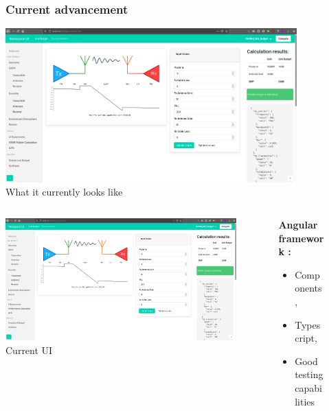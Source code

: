 \documentclass[11pt]{beamer}
\begin{document}
\begin{frame}
	\begin{figure}
		\frametitle{Current advancement}
		\includegraphics[width=\textwidth]{nlb.png}
			\caption{What it currently looks like}
	\end{figure}
\end{frame}

\begin{frame}
\begin{columns}[onlytextwidth]
	\begin{column}{0.4\textwidth}
		\begin{figure}
			\includegraphics[width=\textwidth]{nlb.png}
			\caption{Current UI}
		\end{figure}
	\end{column}
	\hfill
	\begin{column}{0.45\textwidth}
		\textbf{Angular framework :} 
		\begin{itemize}
			\item Components,
			\item Typescript,  
			\item Good testing capabilities
		\end{itemize}
		\bigbreak
	\end{column}
\end{columns}
\end{frame}
\end{document}
